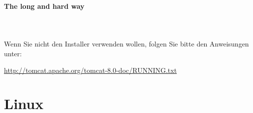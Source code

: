 \documentclass[a4paper, 12pt]{scrreprt}
\begin{document}
\newpage
\ \\
\ \\
\ \\
\ \\
\paragraph{The long and hard way}\ \\
\ \\
Wenn Sie nicht den Installer verwenden wollen, folgen Sie bitte den Anweisungen unter:
\begin{center}
	\url{http://tomcat.apache.org/tomcat-8.0-doc/RUNNING.txt}
\end{center}
\newpage
\section{Linux}
\end{document}
